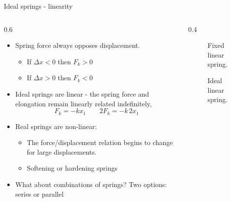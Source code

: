 \documentclass[11pt,aspectratio=169,handout]{beamer}
\begin{document}
\begin{frame}[c]{Ideal springs - linearity}
	\begin{columns}[T]
		\begin{column}{0.6\textwidth}
			\begin{itemize}
				\item Spring force always opposes displacement.
				\begin{itemize}
					\item[-] If $\Delta x<0$ then  $F_k>0$
					\item[-] If $\Delta x>0$ then  $F_k<0$
				\end{itemize}
			\item Ideal springs are linear - the spring force and elongation remain linearly related indefinitely,
			\begin{equation}
				F_k = -kx_1 \quad \quad 2F_k = -k\, 2x_1 
			\end{equation}
			\item Real springs are non-linear:
			\begin{itemize} 
				\item[-] The force/displacement relation begins to change for large displacements.
				\item[-] Softening or hardening springs
				\end{itemize}
			\item What about combinations of springs? Two options: series or parallel
		\end{itemize}
		\end{column}
		\begin{column}{0.4\textwidth}
			\begin{figure}
				\centering
				
				\caption{Fixed linear spring.}
			\end{figure}
			\begin{figure}
				\centering
				
				\caption{Ideal linear spring.}
			\end{figure}
		\end{column}
	\end{columns}
\end{frame}
\end{document}
